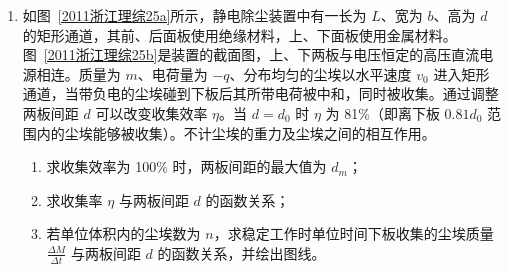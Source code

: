 \documentclass[\gkver]{gaokaozhenti}
\begin{document}
\begin{enumerate}

\item
如图~\ref{2011浙江理综25a}所示，静电除尘装置中有一长为 $L$、宽为 $b$、高为 $d$ 的矩形通道，其前、后面板使用绝缘材料，上、下面板使用金属材料。图~\ref{2011浙江理综25b}是装置的截面图，上、下两板与电压恒定的高压直流电源相连。质量为 $m$、电荷量为 $-q$、分布均匀的尘埃以水平速度 $v_{0}$ 进入矩形通道，当带负电的尘埃碰到下板后其所带电荷被中和，同时被收集。通过调整两板间距 $d$ 可以改变收集效率 $\eta$。当 $d=d_{0}$ 时 $\eta$ 为 81\%（即离下板 $0.81d_{0}$ 范围内的尘埃能够被收集）。不计尘埃的重力及尘埃之间的相互作用。

\begin{enumerate}
	\item
	求收集效率为 100\% 时，两板间距的最大值为 $d_{m}$；
	\item
	求收集率 $\eta$ 与两板间距 $d$ 的函数关系；
	\item
	若单位体积内的尘埃数为 $n$，求稳定工作时单位时间下板收集的尘埃质量 $\frac{\Delta M}{\Delta t}$ 与两板间距 $d$ 的函数关系，并绘出图线。
\end{enumerate}


\end{enumerate}
\end{document}
